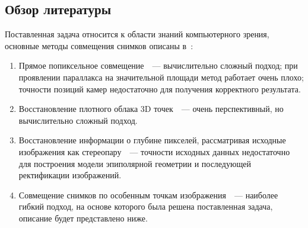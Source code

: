 \documentclass[a4paper,12pt]{article}
\begin{document}
\subsection{Обзор литературы}
Поставленная задача относится к области знаний компьютерного зрения, 
основные методы совмещения снимков описаны 
в~\cite{zitova03is-survey, szelisky06alignstichtut, szelisky10compvis}:
\begin{enumerate}
  \item Прямое попиксельное совмещение~\cite{bergen92hmbme}~--- 
  вычислительно сложный подход; 
  при проявлении параллакса на значительной площади метод работает очень плохо;
  точности позиций камер недостаточно для получения корректного
  результата.
  \item Восстановление плотного облака 3D точек~\cite{furu09mvs}~--- очень перспективный, 
  но вычислительно сложный подход.
  \item Восстановление информации о глубине пикселей, рассматривая исходные
  изображения как стереопару~\cite{scharstein02taxonomy}~--- 
  точности исходных данных недостаточно для построения модели эпиполярной 
  геометрии и последующей ректификации изображений.
  \item Совмещение снимков по особенным точкам изображения~\cite{cham98matchframework, brown03recognising, mclauchlan02mosaic}~--- 
  наиболее гибкий подход, на основе которого была решена поставленная задача, 
  описание будет представлено ниже.
\end{enumerate}


\end{document}
